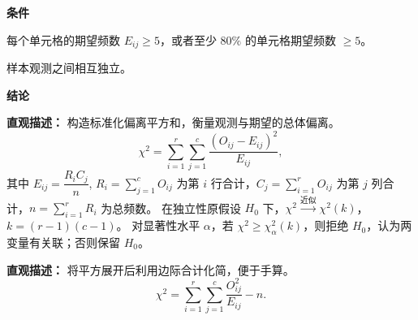 \begin{statementbox}
	\textbf{\textcolor{CStatement}{条件}}
	\begin{description}[style=nextline, leftmargin=2.8em, labelsep=0.5em, itemsep=0.35em]
		\item[\textbf{\textcolor{CStatement}{条件1（期望频数要求）：}}] 每个单元格的期望频数 $E_{ij}\geq 5$，或者至少 $80\%$ 的单元格期望频数 $\geq 5$。
		\item[\textbf{\textcolor{CStatement}{条件2（样本独立性）：}}] 样本观测之间相互独立。
	\end{description}

	\textbf{\textcolor{CStatement}{结论}}
	\begin{description}[style=nextline, leftmargin=2.8em, labelsep=0.5em, itemsep=0.45em]
		\item[\textbf{\textcolor{CStatement}{结论一（卡方统计量定义）：}}]
			\textbf{\textcolor{CStatement}{直观描述：}}
			构造标准化偏离平方和，衡量观测与期望的总体偏离。
			\[
				\chi^2 = \sum_{i=1}^r\sum_{j=1}^c \frac{(O_{ij}-E_{ij})^2}{E_{ij}},
			\]
			其中 $E_{ij} = \dfrac{R_i C_j}{n}$, $R_i=\sum_{j=1}^c O_{ij}$ 为第 $i$ 行合计，$C_j=\sum_{i=1}^r O_{ij}$ 为第 $j$ 列合计，$n=\sum_{i=1}^r R_i$ 为总频数。
			在独立性原假设 $H_0$ 下，$\chi^2 \xrightarrow{\text{近似}} \chi^2(k)$，$k=(r-1)(c-1)$。
			对显著性水平 $\alpha$，若 $\chi^2 \geq \chi^2_\alpha(k)$，则拒绝 $H_0$，认为两变量有关联；否则保留 $H_0$。

		\item[\textbf{\textcolor{CStatement}{常见变形（等价计算公式）：}}]
			\textbf{\textcolor{CStatement}{直观描述：}}
			将平方展开后利用边际合计化简，便于手算。
			\[
				\chi^2 = \sum_{i=1}^r\sum_{j=1}^c \frac{O_{ij}^2}{E_{ij}} - n.
			\]
	\end{description}
\end{statementbox}
